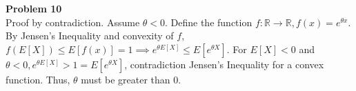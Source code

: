 \documentclass[letterpaper,12pt]{article}
\theoremstyle{definition}
\begin{document}
\noindent\textbf{Problem 10}\\
Proof by contradiction. Assume $\theta < 0$. Define the function $f: \mathbb{R}\to \mathbb{R}, f(x) = e^{\theta x}$. By Jensen's Inequality and convexity of $f$, $f(E[X]) \leq E[f(x)] = 1 \implies e^{\theta E[X]} \leq E[e^{\theta X}].$ For $E[X]<0$ and $\theta<0, e^{\theta E[X]} > 1 = E[e^{\theta X}]$, contradiction Jensen's Inequality for a convex function. Thus, $\theta$ must be greater than 0. 
\end{document}
